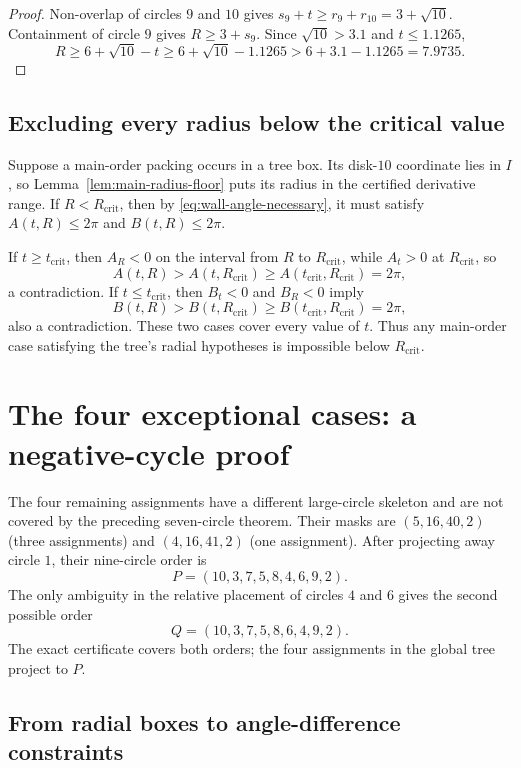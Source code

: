 \documentclass[11pt,a4paper]{article}
\theoremstyle{remark}
\newcommand{\Rcrit}{R_{\mathrm{crit}}}
\begin{document}
\begin{proof}
Non-overlap of circles $9$ and $10$ gives
$s_9+t\ge r_9+r_{10}=3+\sqrt{10}$.  Containment of circle $9$ gives
$R\ge3+s_9$.  Since $\sqrt{10}>3.1$ and $t\le1.1265$,
\[
 R\ge6+\sqrt{10}-t
   \ge6+\sqrt{10}-1.1265
   >6+3.1-1.1265
   =7.9735.
\]
\end{proof}

\subsection{Excluding every radius below the critical value}

Suppose a main-order packing occurs in a tree box.  Its disk-$10$ coordinate
lies in $I$, so Lemma~\ref{lem:main-radius-floor} puts its radius in the
certified derivative range.  If $R<\Rcrit$, then by
\eqref{eq:wall-angle-necessary}, it must satisfy $A(t,R)\le2\pi$ and
$B(t,R)\le2\pi$.

If $t\ge t_{\mathrm{crit}}$, then $A_R<0$ on the interval from $R$ to
$R_{\mathrm{crit}}$, while $A_t>0$ at $R_{\mathrm{crit}}$, so
\[
 A(t,R)>A(t,\Rcrit)
          \ge A(t_{\mathrm{crit}},\Rcrit)=2\pi,
\]
a contradiction.  If $t\le t_{\mathrm{crit}}$, then $B_t<0$ and
$B_R<0$ imply
\[
 B(t,R)>B(t,\Rcrit)
          \ge B(t_{\mathrm{crit}},\Rcrit)=2\pi,
\]
also a contradiction.  These two cases cover every value of $t$.  Thus any
main-order case satisfying the tree's radial hypotheses is impossible below
$\Rcrit$.

\section{The four exceptional cases: a negative-cycle proof}
\label{sec:four-cases}

The four remaining assignments have a different large-circle skeleton and
are not covered by the preceding seven-circle theorem.  Their masks are
$(5,16,40,2)$ (three assignments) and $(4,16,41,2)$ (one assignment).
After projecting away circle $1$, their nine-circle order is
\[
 P=(10,3,7,5,8,4,6,9,2).
\]
The only ambiguity in the relative placement of circles $4$ and $6$ gives
the second possible order
\[
 Q=(10,3,7,5,8,6,4,9,2).
\]
The exact certificate covers both orders; the four assignments in the global
tree project to $P$.

\subsection{From radial boxes to angle-difference constraints}
\end{document}
